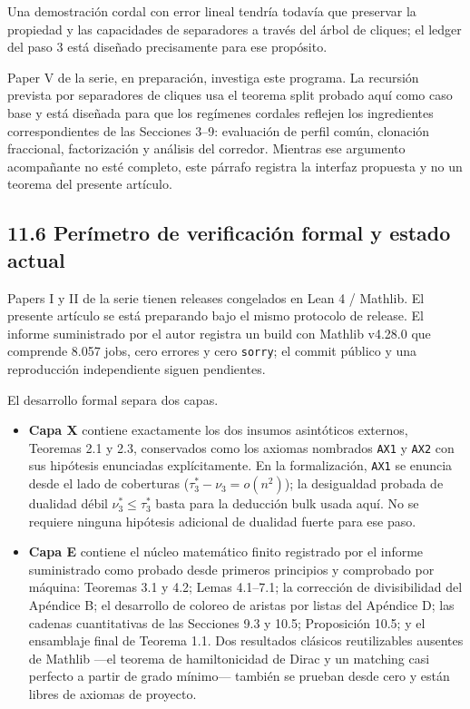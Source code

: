 \documentclass[
  11pt,
]{article}
\providecommand{\tightlist}{%
  \setlength{\itemsep}{0pt}\setlength{\parskip}{0pt}}
\begin{document}
Una demostración cordal con error lineal tendría todavía que preservar
la propiedad y las capacidades de separadores a través del árbol de
cliques; el ledger del paso 3 está diseñado precisamente para ese
propósito.

Paper V de la serie, en preparación, investiga este programa. La
recursión prevista por separadores de cliques usa el teorema split
probado aquí como caso base y está diseñada para que los regímenes
cordales reflejen los ingredientes correspondientes de las Secciones
3--9: evaluación de perfil común, clonación fraccional, factorización y
análisis del corredor. Mientras ese argumento acompañante no esté
completo, este párrafo registra la interfaz propuesta y no un teorema
del presente artículo.

\subsection{11.6 Perímetro de verificación formal y estado
actual}\label{peruxedmetro-de-verificaciuxf3n-formal-y-estado-actual}

Papers I y II de la serie tienen releases congelados en Lean 4 /
Mathlib. El presente artículo se está preparando bajo el mismo protocolo
de release. El informe suministrado por el autor registra un build con
Mathlib v4.28.0 que comprende 8.057 jobs, cero errores y cero
\texttt{sorry}; el commit público y una reproducción independiente
siguen pendientes.

El desarrollo formal separa dos capas.

\begin{itemize}
\tightlist
\item
  \textbf{Capa X} contiene exactamente los dos insumos asintóticos
  externos, Teoremas 2.1 y 2.3, conservados como los axiomas nombrados
  \texttt{AX1} y \texttt{AX2} con sus hipótesis enunciadas
  explícitamente. En la formalización, \texttt{AX1} se enuncia desde el
  lado de coberturas (\(\tau_3^*-\nu_3=o(n^2)\)); la desigualdad probada
  de dualidad débil \(\nu_3^*\le\tau_3^*\) basta para la deducción bulk
  usada aquí. No se requiere ninguna hipótesis adicional de dualidad
  fuerte para ese paso.
\item
  \textbf{Capa E} contiene el núcleo matemático finito registrado por el
  informe suministrado como probado desde primeros principios y
  comprobado por máquina: Teoremas 3.1 y 4.2; Lemas 4.1--7.1; la
  corrección de divisibilidad del Apéndice B; el desarrollo de coloreo
  de aristas por listas del Apéndice D; las cadenas cuantitativas de las
  Secciones 9.3 y 10.5; Proposición 10.5; y el ensamblaje final de
  Teorema 1.1. Dos resultados clásicos reutilizables ausentes de Mathlib
  ---el teorema de hamiltonicidad de Dirac y un matching casi perfecto a
  partir de grado mínimo--- también se prueban desde cero y están libres
  de axiomas de proyecto.
\end{itemize}
\end{document}

